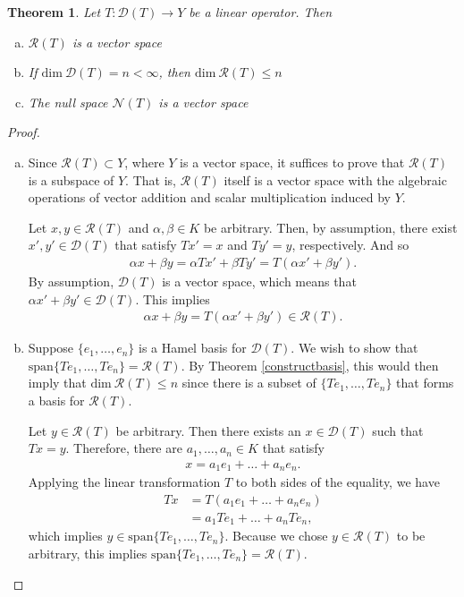 \documentclass[11pt]{article}
\theoremstyle{mystyle}
\newtheorem{thm}{Theorem}[section]
\newcommand{\0}{\mathbf{0}}
\begin{document}
\begin{thm}\label{rangevectorspace}
Let $T: \mathscr{D}(T) \longrightarrow Y$ be a linear operator. Then
\begin{enumerate}[(a)]
    \item $\mathscr{R}(T)$ is a vector space
    \item If $\text{dim} \ \mathscr{D}(T) = n < \infty$, then $\text{dim} \ \mathscr{R}(T) \leq n$
    \item The null space $\mathscr{N}(T)$ is a vector space
\end{enumerate}
\end{thm}
\begin{proof}
\begin{enumerate}[(a)]
    \item Since $\mathscr{R}(T) \subset Y$, where $Y$ is a vector space, it suffices to prove that $\mathscr{R}(T)$ is a subspace of $Y$. That is, $\mathscr{R}(T)$ itself is a vector space with the algebraic operations of vector addition and scalar multiplication induced by $Y$. 
    
    Let $x, y \in \mathscr{R}(T)$ and $\alpha, \beta \in K$ be arbitrary. Then, by assumption, there exist $x', y' \in \mathscr{D}(T)$ that satisfy $Tx' = x$ and $Ty' = y$, respectively. And so
    \begin{align*}
        \alpha x + \beta y = \alpha Tx' + \beta Ty' = T(\alpha x' + \beta y').
    \end{align*}
    By assumption, $\mathscr{D}(T)$ is a vector space, which means that $\alpha x' + \beta y' \in \mathscr{D}(T)$. This implies
    \begin{align*}
         \alpha x + \beta y = T(\alpha x' + \beta y') \in \mathscr{R}(T).
    \end{align*}
    
    \item Suppose $\{e_1, \ldots, e_n\}$ is a Hamel basis for $\mathscr{D}(T)$. We wish to show that $\text{span}\{Te_1, \ldots, Te_n\} = \mathscr{R}(T)$. By Theorem \ref{constructbasis}, this would then imply that $\text{dim} \ \mathscr{R}(T) \leq n$ since there is a subset of $\{Te_1, \ldots, Te_n\}$ that forms a basis for $\mathscr{R}(T)$.
    
    Let $y \in \mathscr{R}(T)$ be arbitrary. Then there exists an $x \in \mathscr{D}(T)$ such that $Tx = y$. Therefore, there are $a_1, \ldots, a_n \in K$ that satisfy
    \begin{align*}
        x = a_1 e_1 + \ldots + a_n e_n.
    \end{align*}
    Applying the linear transformation $T$ to both sides of the equality, we have
    \begin{align*}
        Tx &= T(a_1 e_1 + \ldots + a_n e_n)\\
        &= a_1 Te_1 + \ldots + a_n Te_n,
    \end{align*}
    which implies $y \in \text{span}\{Te_1, \ldots, Te_n\}$. Because we chose $y \in \mathscr{R}(T)$ to be arbitrary, this implies $\text{span}\{Te_1, \ldots, Te_n\} = \mathscr{R}(T)$.
    

\end{enumerate}
\end{proof}
\end{document}
